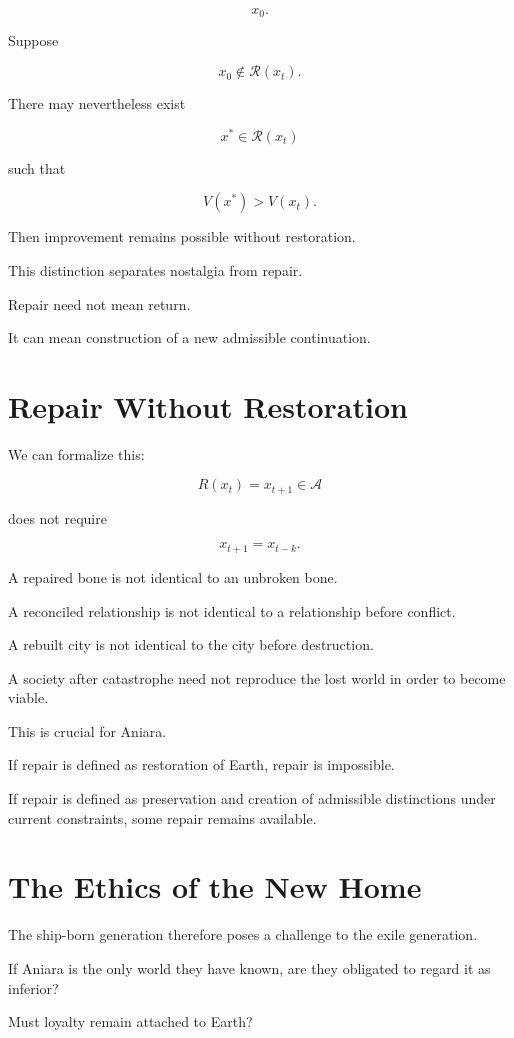 \documentclass[11pt,oneside]{book}
\theoremstyle{definition}
\theoremstyle{remark}
\newcommand{\A}{\mathcal{A}}
\newcommand{\R}{\mathcal{R}}
\begin{document}
\[
x_0.
\]

Suppose

\[
x_0\notin\R(x_t).
\]

There may nevertheless exist

\[
x^\ast\in\R(x_t)
\]

such that

\[
V(x^\ast)>V(x_t).
\]

Then improvement remains possible without restoration.

This distinction separates nostalgia from repair.

Repair need not mean return.

It can mean construction of a new admissible continuation.

\section{Repair Without Restoration}

We can formalize this:

\[
R(x_t)
=
x_{t+1}\in\A
\]

does not require

\[
x_{t+1}=x_{t-k}.
\]

A repaired bone is not identical to an unbroken bone.

A reconciled relationship is not identical to a relationship before conflict.

A rebuilt city is not identical to the city before destruction.

A society after catastrophe need not reproduce the lost world in order to become viable.

This is crucial for Aniara.

If repair is defined as restoration of Earth, repair is impossible.

If repair is defined as preservation and creation of admissible distinctions under current constraints, some repair remains available.

\section{The Ethics of the New Home}

The ship-born generation therefore poses a challenge to the exile generation.

If Aniara is the only world they have known, are they obligated to regard it as inferior?

Must loyalty remain attached to Earth?
\end{document}
